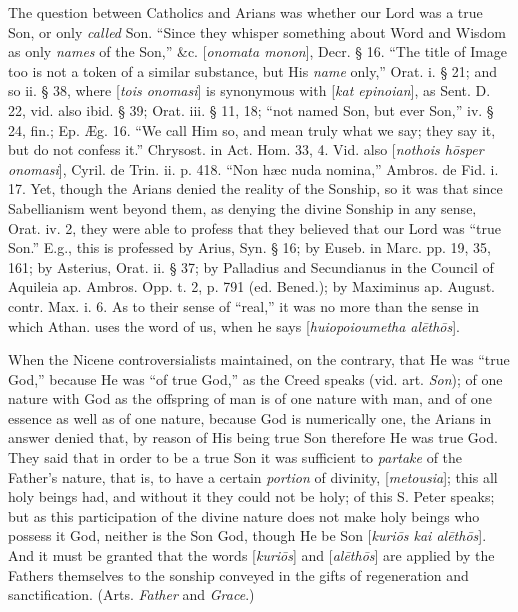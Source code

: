 The question between Catholics and Arians was
whether our Lord was a true Son, or only \emph{called} Son. ``Since
they whisper something about Word and Wisdom as only \emph{names} of
the Son,'' \&c. [\emph{onomata monon}], Decr. § 16. ``The title of
Image too is not a token of a similar substance, but His \emph{name}
only,'' Orat. i. § 21; and so ii. § 38, where [\emph{tois onomasi}]
is synonymous with [\emph{kat epinoian}], as Sent. D. 22, vid. also
ibid. § 39; Orat. iii. § 11, 18; ``not named Son, but ever Son,''
iv. § 24, fin.; Ep. Æg. 16. ``We call Him so, and mean truly what we
say; they say it, but do not confess it.'' Chrysost. in Act. Hom. 33,
4. Vid. also [\emph{nothois h\={o}sper onomasi}], Cyril. de Trin.
ii. p. 418. ``Non hæc nuda nomina,'' Ambros. de Fid. i. 17. Yet, though
the Arians denied the reality of the Sonship, so it was that since
Sabellianism went beyond them, as denying the divine Sonship in any
sense, Orat. iv. 2, they were able to profess that they believed that
our Lord was ``true Son.'' E.g., this is professed by Arius, Syn. § 16;
by Euseb. in Marc. pp. 19, 35, 161; by Asterius, Orat. ii. § 37; by
Palladius and Secundianus in the Council of Aquileia ap. Ambros. Opp.
t. 2, p. 791 (ed. Bened.); by Maximinus ap. August. contr. Max. i. 6.
As to their sense of ``real,'' it was no more than the sense in which
Athan. uses the word of us, when he says [\emph{huiopoioumetha al\={e}th\={o}s}].

When the Nicene controversialists maintained, on
the contrary, that He was ``true God,'' because He was ``of true God,'' as
the Creed speaks (vid. art. \emph{Son}); of one nature with God as the
offspring of man is of one nature with man, and of one essence as well
as of one nature, because God is numerically one, the Arians in answer
denied that, by reason of His being true Son therefore He was true
God. They said that in order to be a true Son it was sufficient to \emph{partake}
of the Father's nature, that is, to have a certain \emph{portion} of
divinity, [\emph{metousia}]; this all holy beings had, and without it
they could not be holy; of this S. Peter speaks; but as this
participation of the divine nature does not make holy beings who
possess it God, neither is the Son God, though He be Son [\emph{kuri\={o}s
kai al\={e}th\={o}s}]. And it must be granted that the words
[\emph{kuri\={o}s}] and [\emph{al\={e}th\={o}s}] are applied
by the Fathers themselves to the sonship conveyed in the gifts of
regeneration and sanctification. (Arts. \emph{Father} and \emph{Grace}.)

